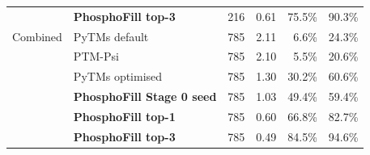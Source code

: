 \begin{table}[h!]
\begin{tabular}{llrrrr}
 & \textbf{PhosphoFill top-3} & 216 & 0.61 & 75.5\% & 90.3\% \\
\addlinespace
Combined & PyTMs default & 785 & 2.11 & 6.6\% & 24.3\% \\
 & PTM-Psi & 785 & 2.10 & 5.5\% & 20.6\% \\
 & PyTMs optimised & 785 & 1.30 & 30.2\% & 60.6\% \\
 & \textbf{PhosphoFill Stage 0 seed} & 785 & 1.03 & 49.4\% & 59.4\% \\
 & \textbf{PhosphoFill top-1} & 785 & 0.60 & 66.8\% & 82.7\% \\
 & \textbf{PhosphoFill top-3} & 785 & 0.49 & 84.5\% & 94.6\% \\
\bottomrule
\end{tabular}
\end{table}
